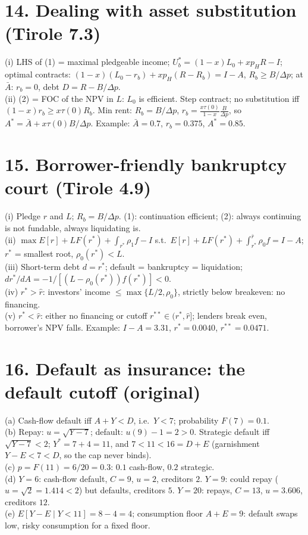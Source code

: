 \documentclass[11pt,a4paper]{article}
\begin{document}
\section*{14. Dealing with asset substitution (Tirole 7.3)}
(i) LHS of (1) = maximal pledgeable income; $U_b^*=(1-x)L_0+xp_HR-I$; optimal contracts:
$(1-x)(L_0-r_b)+xp_H(R-R_b)=I-A$, $R_b\ge B/\Delta p$; at $\bar A$: $r_b=0$, debt $D=R-B/\Delta p$.\\
(ii) (2) = FOC of the NPV in $L$: $L_0$ is efficient. Step contract; no substitution iff
$(1-x)r_b\ge x\tau(0)R_b$. Min rent: $R_b=B/\Delta p$, $r_b=\frac{x\tau(0)}{1-x}\frac{B}{\Delta p}$, so
$A^*=\bar A+x\tau(0)B/\Delta p$. Example: $\bar A=0.7$, $r_b=0.375$, $A^*=0.85$.

\section*{15. Borrower-friendly bankruptcy court (Tirole 4.9)}
(i) Pledge $r$ and $L$; $R_b=B/\Delta p$. (1): continuation efficient; (2): always continuing is not
fundable, always liquidating is.\\
(ii) $\max E[r]+LF(r^*)+\int_{r^*}\rho_1f-I$ s.t.\ $E[r]+LF(r^*)+\int_{r^*}^{\bar r}\rho_0f=I-A$;
$r^*$ = smallest root, $\rho_0(r^*)<L$.\\
(iii) Short-term debt $d=r^*$; default = bankruptcy = liquidation; $dr^*/dA=-1/[(L-\rho_0(r^*))f(r^*)]<0$.\\
(iv) $r^*>\hat r$: investors' income $\le\max\{L/2,\rho_0\}$, strictly below breakeven: no financing.\\
(v) $r^*<\hat r$: either no financing or cutoff $r^{**}\in(r^*,\hat r]$; lenders break even, borrower's
NPV falls. Example: $I-A=3.31$, $r^*=0.0040$, $r^{**}=0.0471$.


\section*{16. Default as insurance: the default cutoff (original)}
(a) Cash-flow default iff $A+Y<D$, i.e.\ $Y<7$; probability $F(7)=0.1$.\\
(b) Repay: $u=\sqrt{Y-7}$; default: $u(9)-1=2>0$. Strategic default iff $\sqrt{Y-7}<2$; $Y^*=7+4=11$, and
$7<11<16=D+E$ (garnishment $Y-E<7<D$, so the cap never binds).\\
(c) $p=F(11)=6/20=0.3$: $0.1$ cash-flow, $0.2$ strategic.\\
(d) $Y=6$: cash-flow default, $C=9$, $u=2$, creditors $2$. $Y=9$: could repay ($u=\sqrt2=1.414<2$) but defaults,
creditors $5$. $Y=20$: repays, $C=13$, $u=3.606$, creditors $12$.\\
(e) $E[Y-E\mid Y<11]=8-4=4$; consumption floor $A+E=9$: default swaps low, risky consumption for a fixed floor.
\end{document}

